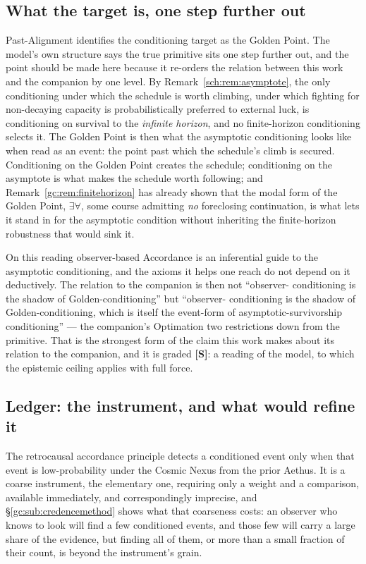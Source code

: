 \documentclass[11pt]{article}
\numberwithin{equation}{section}
\theoremstyle{plain}
\theoremstyle{definition}
\theoremstyle{remark}
\begin{document}
\subsection{What the target is, one step further out}\label{ra:sub:asymptote}

Past-Alignment identifies the conditioning target as the Golden Point.
The model's own structure says the true primitive sits one step further
out, and the point should be made here because it re-orders the relation
between this work and the companion by one level. By Remark~\ref{sch:rem:asymptote}, the only conditioning under which the
schedule is worth climbing, under which fighting for non-decaying
capacity is probabilistically preferred to external luck, is
conditioning on survival to the \emph{infinite horizon}, and no
finite-horizon conditioning selects it. The Golden Point is then what
the asymptotic conditioning looks like when read as an event: the point
past which the schedule's climb is secured. Conditioning on the Golden
Point creates the schedule; conditioning on the asymptote is what makes
the schedule worth following; and Remark~\ref{gc:rem:finitehorizon} has
already shown that the modal form of the Golden Point, $\exists\forall$,
some course admitting \emph{no} foreclosing continuation, is what lets
it stand in for the asymptotic condition without inheriting the
finite-horizon robustness that would sink it.

On this reading observer-based Accordance is an inferential guide to the
asymptotic conditioning, and the axioms it helps one reach do not depend
on it deductively. The relation to the companion is then not ``observer-
conditioning is the shadow of Golden-conditioning'' but ``observer-
conditioning is the shadow of Golden-conditioning, which is itself the
event-form of asymptotic-survivorship conditioning'' --- the companion's
Optimation two restrictions down from the primitive. That is the
strongest form of the claim this work makes about its relation to the
companion, and it is graded \textbf{[S]}: a reading of the model, to
which the epistemic ceiling applies with full force.

\subsection{Ledger: the instrument, and what would refine it}\label{ra:sub:instrument}

The retrocausal accordance principle detects a conditioned event only
when that event is low-probability under the Cosmic Nexus from the prior
Aethus. It is a coarse instrument, the elementary one, requiring only
a weight and a comparison, available immediately, and correspondingly
imprecise, and \S\ref{gc:sub:credencemethod} shows what that
coarseness costs: an observer who knows to look will find a few
conditioned events, and those few will carry a large share of the
evidence, but finding all of them, or more than a small fraction of
their count, is beyond the instrument's grain.
\end{document}
